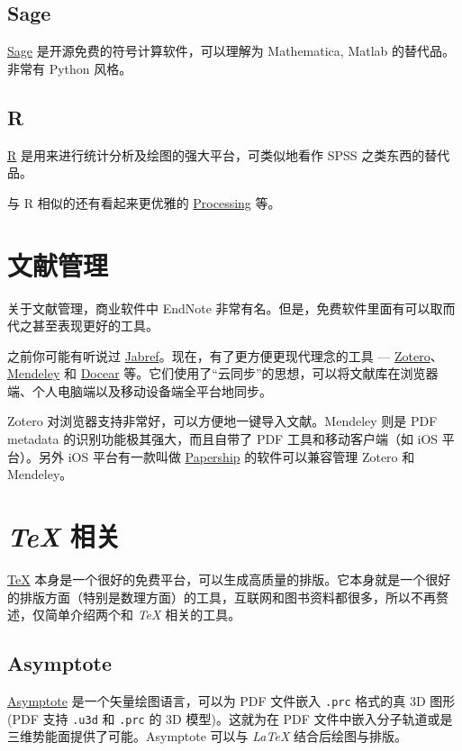 \documentclass[a4paper,openany]{book}
\begin{document}
\subsection{Sage}

\href{http://www.sagemath.org/index.html}{Sage} 是开源免费的符号计算软件，可以理解为 Mathematica, Matlab 的替代品。非常有 Python 风格。

\subsection{R}

\href{http://www.r-project.org}{R} 是用来进行统计分析及绘图的强大平台，可类似地看作 SPSS 之类东西的替代品。

与 R 相似的还有看起来更优雅的 \href{http://processing.org}{Processing} 等。

\section{文献管理}

关于文献管理，商业软件中 EndNote 非常有名。但是，免费软件里面有可以取而代之甚至表现更好的工具。

之前你可能有听说过 \href{http://jabref.sourceforge.net}{Jabref}。现在，有了更方便更现代理念的工具 --- \href{https://www.zotero.org}{Zotero}、\href{http://www.mendeley.com}{Mendeley} 和 \href{http://www.docear.org}{Docear} 等。它们使用了“云同步”的思想，可以将文献库在浏览器端、个人电脑端以及移动设备端全平台地同步。

Zotero 对浏览器支持非常好，可以方便地一键导入文献。Mendeley 则是 PDF metadata 的识别功能极其强大，而且自带了 PDF 工具和移动客户端（如 iOS 平台）。另外 iOS 平台有一款叫做 \href{http://www.papershipapp.com}{Papership} 的软件可以兼容管理 Zotero 和 Mendeley。

\section{\emph{\TeX} 相关}

\href{http://tug.org}{\TeX} 本身是一个很好的免费平台，可以生成高质量的排版。它本身就是一个很好的排版方面（特别是数理方面）的工具，互联网和图书资料都很多，所以不再赘述，仅简单介绍两个和 \emph{\TeX} 相关的工具。

\subsection{Asymptote}

\href{http://asymptote.sourceforge.net}{Asymptote} 是一个矢量绘图语言，可以为 PDF 文件嵌入 \texttt{.prc} 格式的真 3D 图形(PDF 支持 \texttt{.u3d} 和 \texttt{.prc} 的 3D 模型)。这就为在 PDF 文件中嵌入分子轨道或是三维势能面提供了可能。Asymptote 可以与 \emph{\LaTeX} 结合后绘图与排版。
\end{document}
